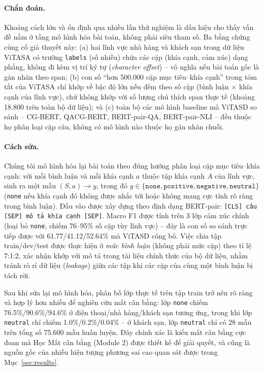 \documentclass[11pt]{article}
\begin{document}
\paragraph{Chẩn đoán.} Khoảng cách lớn và ổn định qua nhiều lần thử nghiệm là dấu hiệu cho thấy vấn đề nằm ở tầng mô hình hóa bài toán, không phải siêu tham số. Ba bằng chứng củng cố giả thuyết này: (a) hai lĩnh vực nhà hàng và khách sạn trong dữ liệu ViTASA có trường \texttt{labels} (số nhiều) chứa các cặp (khía cạnh, cảm xúc) dạng phẳng, không đi kèm vị trí ký tự (\textit{character offset}) -- vô nghĩa nếu bài toán gốc là gán nhãn theo span; (b) con số ``hơn 500.000 cặp mục tiêu--khía cạnh'' trong tóm tắt của ViTASA chỉ khớp về bậc độ lớn nếu đếm theo số cặp (bình luận $\times$ khía cạnh của lĩnh vực), chứ không khớp với số lượng chú thích span thực tế (khoảng 18.800 trên toàn bộ dữ liệu); và (c) toàn bộ các mô hình baseline mà ViTASD so sánh -- CG-BERT, QACG-BERT, BERT-pair-QA, BERT-pair-NLI -- đều thuộc họ phân loại cặp câu, không có mô hình nào thuộc họ gán nhãn chuỗi.

\paragraph{Cách sửa.} Chúng tôi mô hình hóa lại bài toán theo đúng hướng phân loại cặp mục tiêu--khía cạnh: với mỗi bình luận và mỗi khía cạnh $a$ thuộc tập khía cạnh $A$ của lĩnh vực, sinh ra một mẫu $(S, a) \rightarrow y$, trong đó $y \in \{\texttt{none}, \texttt{positive}, \texttt{negative}, \texttt{neutral}\}$ (\texttt{none} nếu khía cạnh đó không được nhắc tới hoặc không mang cực tính rõ ràng trong bình luận). Đầu vào được xây dựng theo định dạng BERT-pair: \texttt{[CLS] câu [SEP] mô tả khía cạnh [SEP]}. Macro F1 được tính trên 3 lớp cảm xúc chính (loại bỏ \texttt{none}, chiếm 76--95\% số cặp tùy lĩnh vực) -- đây là con số so sánh trực tiếp được với 61.77/41.12/52.64\% mà ViTASD công bố. Việc chia tập train/dev/test được thực hiện ở \emph{mức bình luận} (không phải mức cặp) theo tỉ lệ 7:1:2, xác nhận khớp với mô tả trong tài liệu chính thức của bộ dữ liệu, nhằm tránh rò rỉ dữ liệu (\textit{leakage}) giữa các tập khi các cặp của cùng một bình luận bị tách rời.

Sau khi sửa lại mô hình hóa, phân bố lớp thực tế trên tập train trở nên rõ ràng và hợp lý hơn nhiều để nghiên cứu mất cân bằng: lớp \texttt{none} chiếm 76.5\%/90.6\%/94.6\% ở điện thoại/nhà hàng/khách sạn tương ứng, trong khi lớp \texttt{neutral} chỉ chiếm 1.0\%/0.2\%/0.04\% -- ở khách sạn, lớp \texttt{neutral} chỉ có 28 mẫu trên tổng số 75.600 mẫu huấn luyện. Đây chính xác là kiểu mất cân bằng cực đoan mà Học Mất cân bằng (Module 2) được thiết kế để giải quyết, và cũng là nguồn gốc của nhiều hiện tượng phương sai cao quan sát được trong Mục~\ref{sec:results}.
\end{document}
